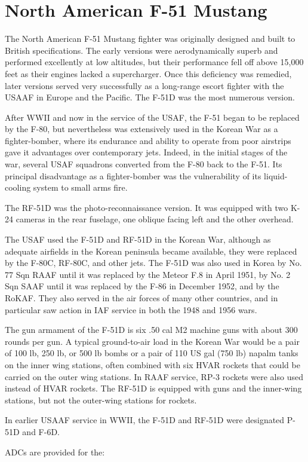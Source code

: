 \section{North American F-51 Mustang}


The North American F-51 Mustang fighter was originally designed and built to British specifications. The early versions were aerodynamically superb and performed excellently at low altitudes, but their performance fell off above 15,000 feet as their engines lacked a supercharger. Once this deficiency was remedied, later versions served very successfully as a long-range escort fighter with the USAAF in Europe and the Pacific. The F-51D was the most numerous version.

After WWII and now in the service of the USAF, the F-51 began to be replaced by the F-80, but nevertheless was extensively used in the Korean War as a fighter-bomber, where its endurance and ability to operate from poor airstrips gave it advantages over contemporary jets. Indeed, in the initial stages of the war, several USAF squadrons converted from the F-80 back to the F-51. Its principal disadvantage as a fighter-bomber was the vulnerability of its liquid-cooling system to small arms fire.

The RF-51D was the photo-reconnaissance version. It was equipped with two K-24 cameras in the rear fuselage, one oblique facing left and the other overhead. 

The USAF used the F-51D and RF-51D in the Korean War, although as adequate airfields in the Korean peninsula became available, they were replaced by the F-80C, RF-80C, and other jets. The F-51D was also used in Korea by No. 77 Sqn RAAF until it was replaced by the Meteor F.8 in April 1951, by No. 2 Sqn SAAF until it was replaced by the F-86 in December 1952, and by the RoKAF. They also served in the air forces of many other countries, and in particular saw action in IAF service in both the 1948 and 1956 wars. 

The gun armament of the F-51D is six .50 cal M2 machine guns with about 300 rounds per gun. A typical ground-to-air load in the Korean War would be a pair of 100 lb, 250 lb, or 500 lb bombs or a pair of 110 US gal (750 lb) napalm tanks on the inner wing stations, often combined with six HVAR rockets that could be carried on the outer wing stations. In RAAF service, RP-3 rockets were also used instead of HVAR rockets. The RF-51D is equipped with guns and the inner-wing stations, but not the outer-wing stations for rockets.

In earlier USAAF service in WWII, the F-51D and RF-51D were designated P-51D and F-6D.

ADCs are provided for the:
\begin{adclist}
\end{adclist}
